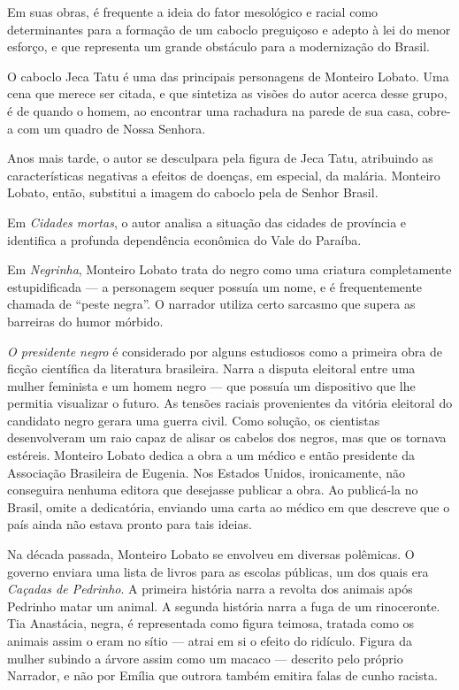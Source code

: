 Em suas obras, é frequente a ideia do fator mesológico e racial como determinantes para a formação de um caboclo preguiçoso e adepto à lei do menor esforço, e que representa um grande obstáculo para a modernização do Brasil.

O caboclo Jeca Tatu é uma das principais personagens de Monteiro Lobato. Uma cena que merece ser citada, e que sintetiza as visões do autor acerca desse grupo, é de quando o homem, ao encontrar uma rachadura na parede de sua casa, cobre-a com um quadro de Nossa Senhora.

Anos mais tarde, o autor se desculpara pela figura de Jeca Tatu, atribuindo as características negativas a efeitos de doenças, em especial, da malária. Monteiro Lobato, então, substitui a imagem do caboclo pela de Senhor Brasil.

Em \textit{Cidades mortas}, o autor analisa a situação das cidades de província e identifica a profunda dependência econômica do Vale do Paraíba.

Em \textit{Negrinha}, Monteiro Lobato trata do negro como uma criatura completamente estupidificada — a personagem sequer possuía um nome, e é frequentemente chamada de ``peste negra''. O narrador utiliza certo sarcasmo que supera as barreiras do humor mórbido.

\textit{O presidente negro} é considerado por alguns estudiosos como a primeira obra de ficção científica da literatura brasileira. Narra a disputa eleitoral entre uma mulher feminista e um homem negro — que possuía um dispositivo que lhe permitia visualizar o futuro. As tensões raciais provenientes da vitória eleitoral do candidato negro gerara uma guerra civil. Como solução, os cientistas desenvolveram um raio capaz de alisar os cabelos dos negros, mas que os tornava estéreis. Monteiro Lobato dedica a obra a um médico e então presidente da Associação Brasileira de Eugenia. Nos Estados Unidos, ironicamente, não conseguira nenhuma editora que desejasse publicar a obra. Ao publicá-la no Brasil, omite a dedicatória, enviando uma carta ao médico em que descreve que o país ainda não estava pronto para tais ideias.

Na década passada, Monteiro Lobato se envolveu em diversas polêmicas. O governo enviara uma lista de livros para as escolas públicas, um dos quais era \textit{Caçadas de Pedrinho}. A primeira história narra a revolta dos animais após Pedrinho matar um animal. A segunda história narra a fuga de um rinoceronte. Tia Anastácia, negra, é representada como figura teimosa, tratada como os animais assim o eram no sítio — atrai em si o efeito do ridículo. Figura da mulher subindo a árvore assim como um macaco — descrito pelo próprio Narrador, e não por Emília que outrora também emitira falas de cunho racista.


